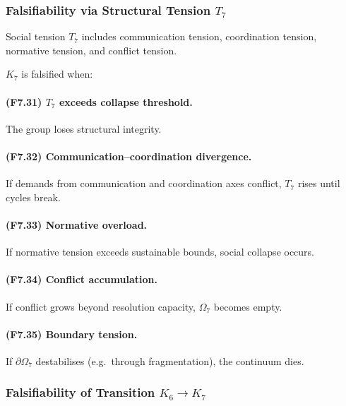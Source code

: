 \subsubsection{Falsifiability via Structural Tension \texorpdfstring{$T_7$}{T_7}}

Social tension $T_7$ includes communication tension,
coordination tension, normative tension, and conflict tension.

$K_7$ is falsified when:

\paragraph{(F7.31) \texorpdfstring{$T_7$}{T_7} exceeds collapse threshold.}
The group loses structural integrity.

\paragraph{(F7.32) Communication–coordination divergence.}
If demands from communication and coordination axes conflict,
$T_7$ rises until cycles break.

\paragraph{(F7.33) Normative overload.}
If normative tension exceeds sustainable bounds,
social collapse occurs.

\paragraph{(F7.34) Conflict accumulation.}
If conflict grows beyond resolution capacity,
$\Omega_7$ becomes empty.

\paragraph{(F7.35) Boundary tension.}
If $\partial\Omega_7$ destabilises (e.g.\ through fragmentation),
the continuum dies.



\subsubsection{Falsifiability of Transition \texorpdfstring{$K_6 \to K_7$}{K_6 \to K_7}}

